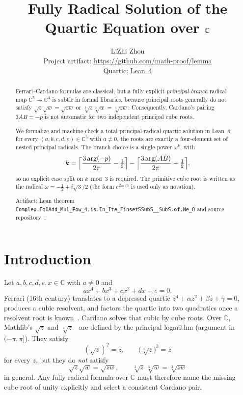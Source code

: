 \documentclass[11pt,a4paper]{article}
\title{Fully Radical Solution of the Quartic Equation over \(\C\)}
\author{LiZhi Zhou\\[0.3em]
\small Project artifact: \url{https://github.com/math-proof/lemma}\\[0.2em]
\small Quartic:
\href{http://www.lemma.cn/lean/?module=Complex.Eq0Add_Mul_Pow_4.is.In_Ite_FinsetSSubS__SubS.of.Ne_0}{Lean~4}}
\date{}
\newcommand{\C}{\mathbb{C}}
\newcommand{\Arg}{\operatorname{arg}}
\begin{document}
\maketitle

\begin{abstract}
Ferrari--Cardano formulas are classical, but a fully explicit \emph{principal-branch} radical map
\(\C^5\to\C^4\) is subtle in formal libraries, because principal roots generally do not satisfy
\(\sqrt{z}\sqrt{w}=\sqrt{zw}\) or \(\sqrt[3]{z}\sqrt[3]{w}=\sqrt[3]{zw}\).
Consequently, Cardano's pairing \(3AB=-p\) is not automatic for two independent principal cube roots.

We formalize and machine-check a total principal-radical quartic solution in Lean~4:
for every \((a,b,c,d,e)\in\C^5\) with \(a\neq 0\), the roots are exactly a four-element set of nested principal radicals.
The branch choice is a single power \(\omega^k\), with
\[
k=\Bigl\lceil\frac{3\Arg(-p)}{2\pi}-\tfrac12\Bigr\rceil
-\Bigl\lceil\frac{3\Arg(AB)}{2\pi}-\tfrac12\Bigr\rceil,
\]
so no explicit case split on \(k\bmod 3\) is required.
The primitive cube root is written as the radical
\(\omega=-\tfrac12+i\sqrt{3}/2\) (the form \(e^{2\pi i/3}\) is used only as notation).

Artifact: Lean theorem
\href{http://www.lemma.cn/lean/?module=Complex.Eq0Add_Mul_Pow_4.is.In_Ite_FinsetSSubS__SubS.of.Ne_0}{\nolinkurl{Complex.Eq0Add_Mul_Pow_4.is.In_Ite_FinsetSSubS__SubS.of.Ne_0}}
and source repository~\cite{lemma_repo}.
\end{abstract}

\section{Introduction}
\label{sec:intro}

Let \(a,b,c,d,e,x\in\C\) with \(a\neq 0\) and
\[
a x^4+b x^3+c x^2+d x+e=0.
\]
Ferrari (16th century) translates to a depressed quartic \(z^4+\alpha z^2+\beta z+\gamma=0\), produces a cubic resolvent, and factors the quartic into two quadratics once a resolvent root is known~\cite{cardano1545}.
Cardano solves that cubic by cube roots.
Over \(\C\), Mathlib's \(\sqrt{z}\) and \(\sqrt[3]{z}\)~\cite{mathlib2020,mathlib} are defined by the principal logarithm (argument in \((-\pi,\pi]\)).
They satisfy
\[
(\sqrt{z})^2=z,\qquad \bigl(\sqrt[3]{z}\bigr)^3=z
\]
for every \(z\), but they do \emph{not} satisfy
\[
\sqrt{z}\sqrt{w}=\sqrt{zw},\qquad \sqrt[3]{z}\,\sqrt[3]{w}=\sqrt[3]{zw}
\]
in general.
Any fully radical formula over \(\C\) must therefore name the missing cube root of unity explicitly and select a consistent Cardano pair.
\end{document}
